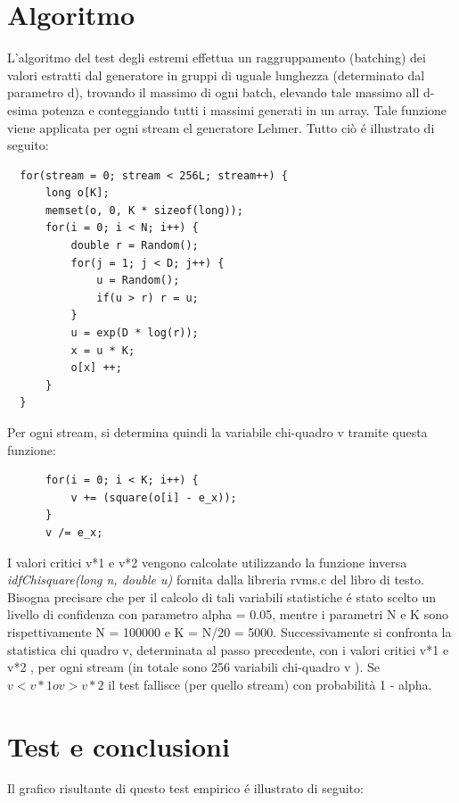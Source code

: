 \section{Algoritmo}
L'algoritmo del test degli estremi effettua un raggruppamento (batching) dei 
valori estratti dal generatore in gruppi di uguale lunghezza (determinato dal 
parametro d), trovando il 
massimo di ogni batch, elevando tale massimo all d-esima potenza e conteggiando 
tutti i massimi generati in un array. Tale funzione viene applicata per ogni 
stream el generatore Lehmer.
Tutto ci\`o \'e illustrato di seguito:
\begin{verbatim}
  for(stream = 0; stream < 256L; stream++) {
      long o[K];
      memset(o, 0, K * sizeof(long));
      for(i = 0; i < N; i++) {
          double r = Random();
          for(j = 1; j < D; j++) {
              u = Random();
              if(u > r) r = u;
          }
          u = exp(D * log(r));
          x = u * K;
          o[x] ++;
      }
  }
\end{verbatim}
Per ogni stream, si determina quindi la variabile chi-quadro v tramite questa 
funzione:
\begin{verbatim}
      for(i = 0; i < K; i++) {
	      v += (square(o[i] - e_x));
      }
      v /= e_x;
\end{verbatim}

I valori critici v*1 e v*2 vengono calcolate utilizzando la funzione inversa 
\textit{idfChisquare(long n, double u)}  fornita dalla libreria rvms.c del libro di 
testo. Bisogna precisare che per il calcolo 
di tali variabili statistiche \'e stato scelto un livello di confidenza con 
parametro alpha = 0.05, mentre i parametri N e K sono rispettivamente N = 100000 
e K = N/20 = 5000.
Successivamente si confronta la statistica chi quadro v, determinata al passo 
precedente, con i valori critici  v*1 e v*2 , per ogni stream (in totale sono 256 
variabili chi-quadro v ).
Se $v < v*1 o v > v*2$ il test fallisce (per quello stream) con probabilità 1 - 
alpha.

\section{Test e conclusioni}
\noindent Il grafico risultante di questo test empirico \'e illustrato di seguito:

